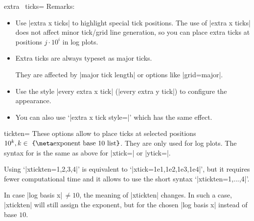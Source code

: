 \begin{pgfplotsxykey}{extra \x\ ticks=}
    Remarks:
    \begin{itemize}
        \item Use |extra x ticks| to highlight special tick positions. The
            use of |extra x ticks| does not affect minor tick/grid line
            generation, so you can place extra ticks at positions $j\cdot
            10^i$ in log plots.
        \item Extra ticks are always typeset as major ticks.

            They are affected by |major tick length| or options like
            |grid=major|.
        \item Use the style |every extra x tick| (|every extra y tick|) to
            configure the appearance.
        \item You can also use `|extra x tick style=|' which has
            the same effect.
    \end{itemize}
\end{pgfplotsxykey}

\begin{pgfplotsxykey}{\x tickten=}
    These options allow to place ticks at selected positions $10^k, k \in
    \text{\marg{exponent base 10 list}}$. They are only used for log plots. The
    syntax for  is the same as above for
    |xtick=| or |ytick=|.

    Using `|xtickten={1,2,3,4}|' is equivalent to `|xtick={1e1,1e2,1e3,1e4}|',
    but it requires fewer computational time and it allows to use the short
    syntax `|xtickten={1,...,4}|'.
\begin{codeexample}[]
\end{codeexample}

    In case |log basis x|$\,\neq 10$, the meaning of |xtickten| changes. In
    such a case, |xtickten| will still assign the exponent, but for the chosen
    |log basis x| instead of base $10$.
\end{pgfplotsxykey}

